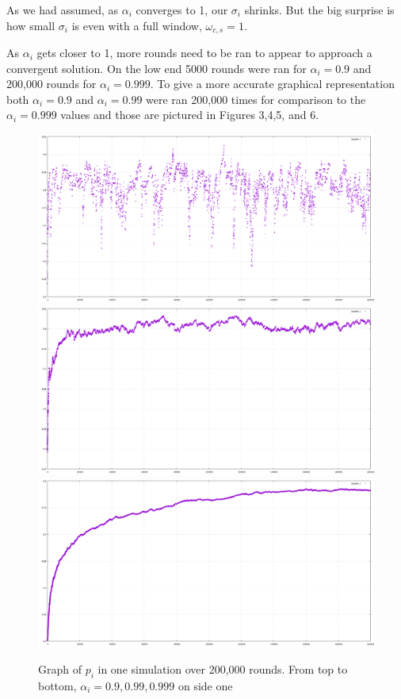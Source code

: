 \documentclass{article}
\begin{document}
As we had assumed, as $\alpha_i$ converges to 1, our $\sigma_i$ shrinks.  But the big surprise is how small $\sigma_i$ is even with a full window, $\omega_{c,s} = 1$.

As $\alpha_i$ gets closer to 1, more rounds need to be ran to appear to approach a convergent solution.  On the low end 5000 rounds were ran for $\alpha_i = 0.9$ and 200,000 rounds for $\alpha_i = 0.999$.  To give a more accurate graphical representation both $\alpha_i = 0.9$ and $\alpha_i = 0.99$ were ran 200,000 times for comparison to the $\alpha_i = 0.999$ values and those are pictured in Figures 3,4,5, and 6.

\begin{figure}[htp]
\centering
\includegraphics[width=.8\textwidth]{images/ai9side1x200000}\hfill
\includegraphics[width=.8\textwidth]{images/ai99side1x200000}\hfill
\includegraphics[width=.8\textwidth]{images/ai999side1x200000}
\caption{Graph of $p_i$ in one simulation over 200,000 rounds. From top to bottom, $\alpha_i = 0.9, 0.99, 0.999$ on side one}
\label{fig:figure3}
\end{figure}
\end{document}
